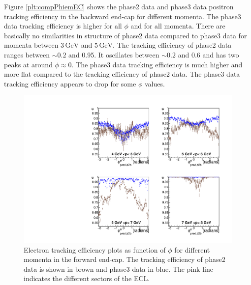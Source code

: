\documentclass[a4paper,11pt,twosided,final,german,openbib,pdftex,listof=totoc,bibliography=totoc]{scrbook}
\begin{document}
Figure \ref{plt:compPhiemEC} shows the phase2 data and phase3 data positron tracking efficiency in the backward end-cap for different momenta.
The phase3 data tracking efficiency is higher for all $\phi$ and for all momenta.
There are basically no similarities in structure of phase2 data compared to phase3 data for momenta between $3\,\textrm{GeV}$ and $5\,\textrm{GeV}$. The tracking efficiency of phase2 data ranges between $\sim 0.2$ and 0.95. It oscillates between $\sim 0.2$ and 0.6 and has two peaks at around $\phi \approx 0$.
The phase3 data tracking efficiency is much higher and more flat compared to the tracking efficiency of phase2 data. The phase3 data tracking efficiency appears to drop for some $\phi$ values.



\begin{figure}[!htbp]
	\centering
	\includegraphics[width=\textwidth]{Plots/comp/cMPhiemFC_Data.pdf}
	\caption[Momentum $\phi$ Electron Efficiency Forward End-Cap Phase2 And Phase3 Data]{Electron tracking efficiency plots as function of $\phi$ for different momenta in the forward end-cap. The tracking efficiency of phase2 data is shown in brown and phase3 data in blue. The pink line indicates the different sectors of the ECL.}
	\label{plt:compPhiemFC}
\end{figure}
\end{document}
